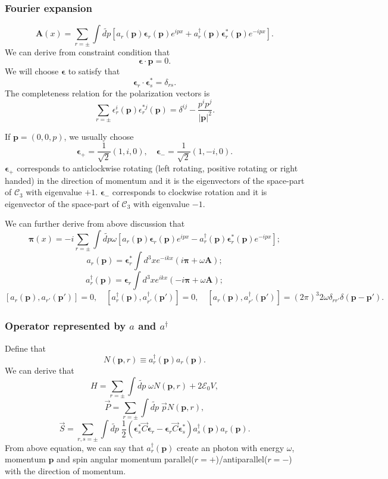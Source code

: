 \subsubsection{Fourier expansion}
\[\bm{A}(x) = \sum_{r = \pm} \int \widetilde{dp} [a_{r}(\bm{p}) \bm{\epsilon}_r(\bm{p})e^{ipx} + a^{\dagger}_{r}(\bm{p}) \bm{\epsilon}^*_r(\bm{p})e^{-ipx}].\]
We can derive from constraint condition that
\[\bm{\epsilon} \cdot \bm{p} = 0.\]
We will choose $\bm{\epsilon}$ to satisfy that
\[\bm{\epsilon}_r \cdot \bm{\epsilon}^*_s = \delta_{rs}.\]
The completeness relation for the polarization vectors is
\[\sum_{r=\pm} \epsilon_r^i(\bm{p}) \epsilon_r^{*j}(\bm{p}) = \delta^{ij} - \frac{p^ip^j}{|\bm{p}|^2}.\]
\begin{example}
If $\bm{p} = (0,0,p)$, we usually choose 
\[\bm{\epsilon}_{+} = \frac{1}{\sqrt{2}}(1,i,0) , \quad \bm{\epsilon}_{-} = \frac{1}{\sqrt{2}}(1,-i,0) .\]
$\bm{\epsilon}_{+}$ corresponds to anticlockwise rotating (left rotating, positive rotating or right handed) in the direction of momentum and it is the eigenvectors of the space-part of $\mathcal{C}_3$ with eigenvalue $+1$. $\bm{\epsilon}_{-}$ corresponds to clockwise rotation and it is eigenvector of the space-part of $\mathcal{C}_3$ with eigenvalue $- 1$.
\end{example}
\noindent
We can further derive from above discussion that
\[\bm{\pi}(x) = -i \sum_{r = \pm} \int \widetilde{dp} \omega [a_{r}(\bm{p}) \bm{\epsilon}_r(\bm{p})e^{ipx} - a^{\dagger}_{r}(\bm{p}) \bm{\epsilon}^*_r(\bm{p})e^{-ipx}];\]
\[a_r(\bm{p}) = \bm{\epsilon}^*_r \int d^3x e^{-ikx}(i\bm{\pi}+\omega\bm{A});\]
\[a^{\dagger}_r(\bm{p}) = \bm{\epsilon}_r \int d^3x e^{ikx}(-i\bm{\pi}+\omega\bm{A});\]
\[[a_r(\bm{p}),a_{r'}(\bm{p'})] = 0 , \quad [a^{\dagger}_r(\bm{p}),a^{\dagger}_{r'}(\bm{p'})] = 0 , \quad [a_r(\bm{p}),a^{\dagger}_{r'}(\bm{p'})] = (2\pi)^3 2\omega \delta_{rr'} \delta(\bm{p} - \bm{p}').\]

\subsubsection{Operator represented by $a$ and $a^{\dagger}$}
Define that
\[N(\bm{p},r) \equiv a^{\dagger}_{r}(\bm{p}) a_r(\bm{p}).\]
We can derive that
\[H = \sum_{r = \pm} \int \widetilde{dp} \; \omega N(\bm{p},r) + 2\mathcal{E}_0V,\]
\[\vec{P} = \sum_{r = \pm} \int \widetilde{dp} \; \vec{p} N(\bm{p},r) ,\]
\[\vec{S} = \sum_{r,s = \pm} \int \widetilde{dp} \; \frac{1}{2}(\bm{\epsilon}^*_{s} \vec{C}\bm{\epsilon}_{r} - \bm{\epsilon}_{r} \vec{C}\bm{\epsilon}^*_{s}) a^{\dagger}_{s}(\bm{p}) a_r(\bm{p}).\]
From above equation, we can say that $a^{\dagger}_r(\bm{p})$ create an photon with energy $\omega$, momentum $\bm{p}$ and spin angular momentum parallel($r=+$)/antiparallel($r=-$) with the direction of momentum.

